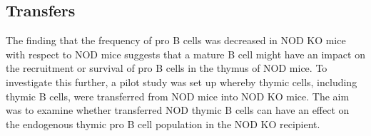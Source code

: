 



\subsection{Transfers}

The finding that the frequency of pro B cells was decreased in NOD KO mice with respect to NOD mice suggests that a mature B cell might have an impact on the recruitment or survival of pro B cells in the thymus of NOD mice.
To investigate this further, a pilot study was set up whereby thymic cells, including thymic B cells, were transferred from NOD mice into NOD KO mice.
The aim was to examine whether transferred NOD thymic B cells can have an effect on the endogenous thymic pro B cell population in the NOD KO recipient.

